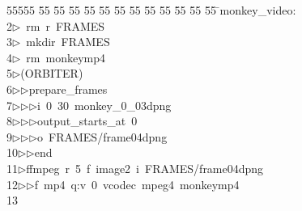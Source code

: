 %
%
\begin{tabbing}
55555 \= 55 \= 55 \= 55 \= 55 \= 55 \= 55 \= 55 \= 55 \= 55 \= 55 \= 55 \= 55 \= \>monkey\_video:\\[0pt]
2\>$\triangleright$\>\ rm\ r\ FRAMES\\[0pt]
3\>$\triangleright$\>\ mkdir\ FRAMES\\[0pt]
4\>$\triangleright$\>\ rm\ monkeymp4\\[0pt]
5\>$\triangleright$\>(ORBITER)\ \\[0pt]
6\>$\triangleright$\>$\triangleright$\>prepare\_frames\ \\[0pt]
7\>$\triangleright$\>$\triangleright$\>$\triangleright$\>i\ 0\ 30\ monkey\_0\_03dpng\ \\[0pt]
8\>$\triangleright$\>$\triangleright$\>$\triangleright$\>output\_starts\_at\ 0\ \\[0pt]
9\>$\triangleright$\>$\triangleright$\>$\triangleright$\>o\ FRAMES/frame04dpng\ \\[0pt]
10\>$\triangleright$\>$\triangleright$\>end\\[0pt]
11\>$\triangleright$\>ffmpeg\ r\ 5\ f\ image2\ i\ FRAMES/frame04dpng\ \\[0pt]
12\>$\triangleright$\>$\triangleright$\>f\ mp4\ q:v\ 0\ vcodec\ mpeg4\ monkeymp4\\[0pt]
13\>\end{tabbing}
